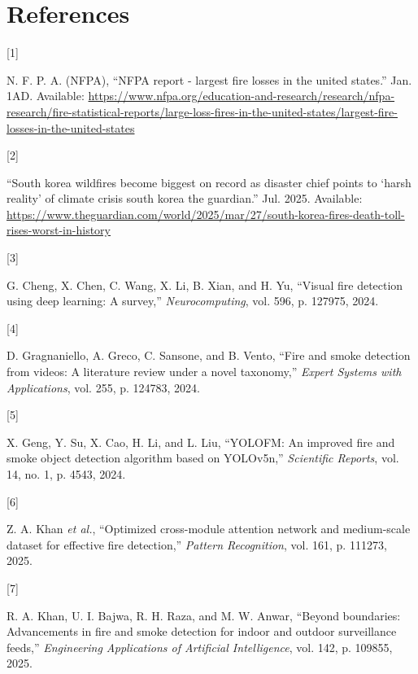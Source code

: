 \documentclass[
  10pt,
]{article}
\newlength{\cslhangindent}
\newlength{\csllabelwidth}
\newenvironment{CSLReferences}[2] %
 {\begin{list}{}{%
  \setlength{\itemindent}{0pt}
  \setlength{\leftmargin}{0pt}
  \setlength{\parsep}{0pt}
  \ifodd #1
   \setlength{\leftmargin}{\cslhangindent}
   \setlength{\itemindent}{-1\cslhangindent}
  \fi
  \setlength{\itemsep}{#2\baselineskip}}}
 {\end{list}}
\newcommand{\CSLLeftMargin}[1]{\parbox[t]{\csllabelwidth}{\strut#1\strut}}
\newcommand{\CSLRightInline}[1]{\parbox[t]{\linewidth - \csllabelwidth}{\strut#1\strut}}
\begin{document}
\section*{References}\label{sec:references}

\label{refs}
\begin{CSLReferences}{0}{0}
\CSLLeftMargin{{[}1{]} }%
\CSLRightInline{N. F. P. A. (NFPA), {``NFPA report - largest fire losses
in the united states.''} Jan. 1AD. Available:
\url{https://www.nfpa.org/education-and-research/research/nfpa-research/fire-statistical-reports/large-loss-fires-in-the-united-states/largest-fire-losses-in-the-united-states}}

\CSLLeftMargin{{[}2{]} }%
\CSLRightInline{{``South korea wildfires become biggest on record as
disaster chief points to {`harsh reality'} of climate crisis \textbar{}
south korea \textbar{} the guardian.''} Jul. 2025. Available:
\url{https://www.theguardian.com/world/2025/mar/27/south-korea-fires-death-toll-rises-worst-in-history}}

\CSLLeftMargin{{[}3{]} }%
\CSLRightInline{G. Cheng, X. Chen, C. Wang, X. Li, B. Xian, and H. Yu,
{``Visual fire detection using deep learning: A survey,''}
\emph{Neurocomputing}, vol. 596, p. 127975, 2024.}

\CSLLeftMargin{{[}4{]} }%
\CSLRightInline{D. Gragnaniello, A. Greco, C. Sansone, and B. Vento,
{``Fire and smoke detection from videos: A literature review under a
novel taxonomy,''} \emph{Expert Systems with Applications}, vol. 255, p.
124783, 2024.}

\CSLLeftMargin{{[}5{]} }%
\CSLRightInline{X. Geng, Y. Su, X. Cao, H. Li, and L. Liu, {``YOLOFM: An
improved fire and smoke object detection algorithm based on YOLOv5n,''}
\emph{Scientific Reports}, vol. 14, no. 1, p. 4543, 2024.}

\CSLLeftMargin{{[}6{]} }%
\CSLRightInline{Z. A. Khan \emph{et al.}, {``Optimized cross-module
attention network and medium-scale dataset for effective fire
detection,''} \emph{Pattern Recognition}, vol. 161, p. 111273, 2025.}

\CSLLeftMargin{{[}7{]} }%
\CSLRightInline{R. A. Khan, U. I. Bajwa, R. H. Raza, and M. W. Anwar,
{``Beyond boundaries: Advancements in fire and smoke detection for
indoor and outdoor surveillance feeds,''} \emph{Engineering Applications
of Artificial Intelligence}, vol. 142, p. 109855, 2025.}


\end{CSLReferences}
\end{document}
